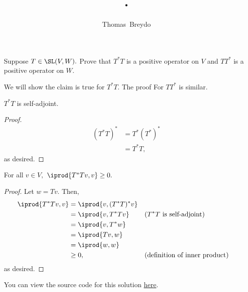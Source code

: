\documentclass{amsart}
\title{\pagenum.\probnum}
\author{Thomas\ Breydo}
\newcommand{\pagenum}{231}
\newcommand{\probnum}{4}
\begin{document}
\maketitle

\begin{problem*}
Suppose $T\in\SL(V,W).$ Prove that $T^*T$ is a positive operator
on $V$ and $TT^*$ is a positive operator on $W.$
\end{problem*}

\vspace{0.5in}

We will show the claim is true for $T^*T.$ The proof For
$TT^*$ is similar.
\begin{claim*}
$T^*T$ is self-adjoint.
\end{claim*}
\begin{proof}
\begin{align*}
    \left(T^*T\right)^* &= T^*(T^*)^* \\
                        &= T^*T,
\end{align*}
as desired.
\end{proof}

\begin{claim*}
For all $v\in V,$ $\iprod{T^*Tv,v}\ge0.$
\end{claim*}
\begin{proof}
Let $w=Tv.$ Then,
\begin{align*}
    \iprod{T^*Tv,v} &= \iprod{v, (T^*T)^*v} \\
                    &= \iprod{v, T^*Tv} && (T^*T\text{ is self-adjoint}) \\
                    &= \iprod{v, T^*w} \\
                    &= \iprod{Tv, w} \\
                    &= \iprod{w,w} \\
                    &\ge 0, &&(\text{definition of inner product})
\end{align*} 
as desired.
\end{proof}

\vspace{0.5in}

\begin{note*}
You can view the source code for this solution
\href{https://github.com/thomasbreydo/linalg/blob/main/\pagenum_\probnum_Thomas_Breydo.tex}
{here}.
\end{note*}
\end{document}
